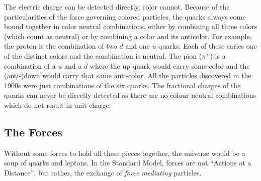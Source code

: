 The electric charge can be detected directly, color cannot. Because of the particularities of the force governing colored particles, the quarks always come bound together in color neutral combinations, either by combining all three colors (which count as neutral) or by combining a color and its anticolor. For example, the proton is the combination of two $d$ and one $u$ quarks. Each of these caries one of the distinct colors and the combination is neutral. The pion ($\pi^+$) is a combination of a $u$ and a $\overline{d}$ where the up quark would carry some color and the (anti-)down would carry that same anti-color. All the particles discovered in the 1900s were just combinations of the six quarks. The fractional charges of the quarks can never be directly detected as there are no colour neutral combinations which do not result in unit charge.

\subsection{The Forces}
Without some forces to hold all these pieces together, the universe would be a soup of quarks and leptons. In the Standard Model, forces are not ``Actions at a Distance'', but rather, the exchange of \textit{force mediating} particles.

